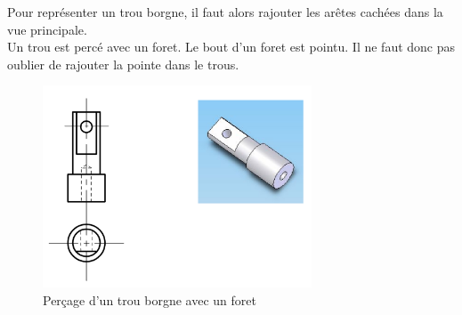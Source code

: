 Pour représenter un trou borgne, il faut alors rajouter les arêtes cachées dans la vue principale.\\
Un trou est percé avec un foret. Le bout d'un foret est pointu. Il ne faut donc pas oublier de rajouter la pointe dans le trous.

\begin{figure}[H]
    \centering
    \includegraphics[width = 8cm]{Images/ImagesDessinTechnique/foretCyclindre.png}
    \caption{Perçage d'un trou borgne avec un foret}
    \label{fig:foret}
\end{figure}
